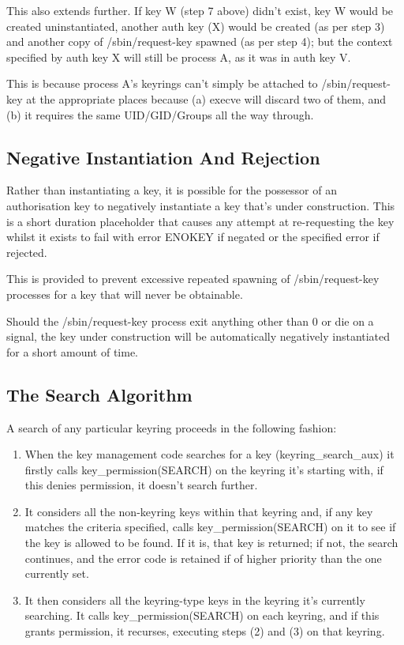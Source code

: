 \documentclass[a4paper,8pt,english]{sphinxmanual}
\begin{document}
This also extends further.  If key W (step 7 above) didn't exist, key W would
be created uninstantiated, another auth key (X) would be created (as per step
3) and another copy of /sbin/request-key spawned (as per step 4); but the
context specified by auth key X will still be process A, as it was in auth key
V.

This is because process A's keyrings can't simply be attached to
/sbin/request-key at the appropriate places because (a) execve will discard two
of them, and (b) it requires the same UID/GID/Groups all the way through.


\subsection{Negative Instantiation And Rejection}
\label{security/keys/request-key:negative-instantiation-and-rejection}
Rather than instantiating a key, it is possible for the possessor of an
authorisation key to negatively instantiate a key that's under construction.
This is a short duration placeholder that causes any attempt at re-requesting
the key whilst it exists to fail with error ENOKEY if negated or the specified
error if rejected.

This is provided to prevent excessive repeated spawning of /sbin/request-key
processes for a key that will never be obtainable.

Should the /sbin/request-key process exit anything other than 0 or die on a
signal, the key under construction will be automatically negatively
instantiated for a short amount of time.


\subsection{The Search Algorithm}
\label{security/keys/request-key:the-search-algorithm}
A search of any particular keyring proceeds in the following fashion:
\begin{enumerate}
\item {} 
When the key management code searches for a key (keyring\_search\_aux) it
firstly calls key\_permission(SEARCH) on the keyring it's starting with,
if this denies permission, it doesn't search further.

\item {} 
It considers all the non-keyring keys within that keyring and, if any key
matches the criteria specified, calls key\_permission(SEARCH) on it to see
if the key is allowed to be found.  If it is, that key is returned; if
not, the search continues, and the error code is retained if of higher
priority than the one currently set.

\item {} 
It then considers all the keyring-type keys in the keyring it's currently
searching.  It calls key\_permission(SEARCH) on each keyring, and if this
grants permission, it recurses, executing steps (2) and (3) on that
keyring.

\end{enumerate}
\end{document}
